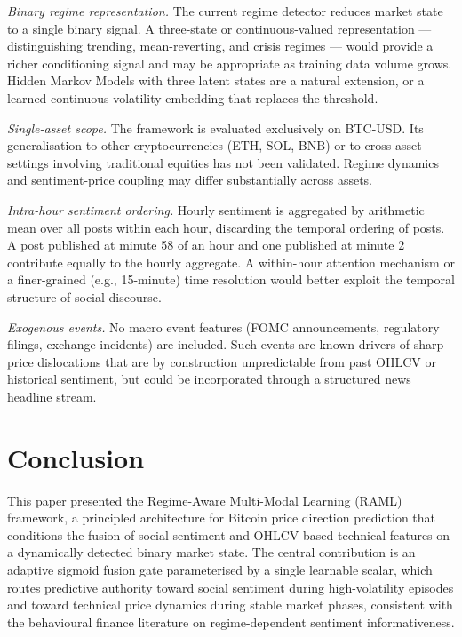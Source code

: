 \documentclass[journal]{IEEEtran}
\newcommand{\raml}{\textsc{RAML}}
\begin{document}
\textit{Binary regime representation.}
The current regime detector reduces market state to a single binary signal.
A three-state or continuous-valued representation — distinguishing trending,
mean-reverting, and crisis regimes — would provide a richer conditioning
signal and may be appropriate as training data volume grows. Hidden Markov
Models with three latent states are a natural extension, or a learned
continuous volatility embedding that replaces the threshold.

\textit{Single-asset scope.}
The framework is evaluated exclusively on BTC-USD. Its generalisation to
other cryptocurrencies (ETH, SOL, BNB) or to cross-asset settings involving
traditional equities has not been validated. Regime dynamics and
sentiment-price coupling may differ substantially across assets.

\textit{Intra-hour sentiment ordering.}
Hourly sentiment is aggregated by arithmetic mean over all posts within
each hour, discarding the temporal ordering of posts. A post published at
minute 58 of an hour and one published at minute 2 contribute equally to
the hourly aggregate. A within-hour attention mechanism or a finer-grained
(e.g., 15-minute) time resolution would better exploit the temporal
structure of social discourse.

\textit{Exogenous events.}
No macro event features (FOMC announcements, regulatory filings, exchange
incidents) are included. Such events are known drivers of sharp price
dislocations that are by construction unpredictable from past OHLCV or
historical sentiment, but could be incorporated through a structured news
headline stream.

\section{Conclusion}
\label{sec:conclusion}

This paper presented the Regime-Aware Multi-Modal Learning (\raml{}) framework,
a principled architecture for Bitcoin price direction prediction that conditions
the fusion of social sentiment and OHLCV-based technical features on a
dynamically detected binary market state. The central contribution is an adaptive
sigmoid fusion gate parameterised by a single learnable scalar, which routes
predictive authority toward social sentiment during high-volatility episodes and
toward technical price dynamics during stable market phases, consistent with the
behavioural finance literature on regime-dependent sentiment informativeness.
\end{document}
